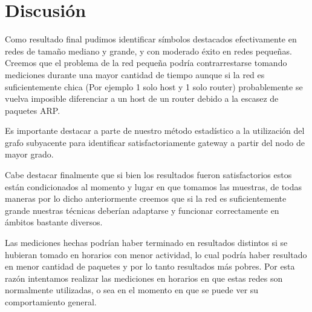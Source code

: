 \section{Discusión}

Como resultado final pudimos identificar símbolos destacados efectivamente en redes de tamaño mediano y grande, y con moderado éxito en redes pequeñas. Creemos que el problema de la red pequeña podría contrarrestarse tomando mediciones durante una mayor cantidad de tiempo aunque si la red es suficientemente chica (Por ejemplo 1 solo host y 1 solo router) probablemente se vuelva imposible diferenciar a un host de un router debido a la escasez de paquetes ARP.

Es importante destacar a parte de nuestro método estadístico a la utilización del grafo subyacente para identificar satisfactoriamente gateway a partir del nodo de mayor grado.

Cabe destacar finalmente que si bien los resultados fueron satisfactorios estos están condicionados al momento y lugar en que tomamos las muestras, de todas maneras por lo dicho anteriormente creemos que si la red es suficientemente grande nuestras técnicas deberían adaptarse y funcionar correctamente en ámbitos bastante diversos.

Las mediciones hechas podrían haber terminado en resultados distintos si se hubieran tomado en horarios con menor actividad, lo cual podría haber resultado en menor cantidad de paquetes y por lo tanto resultados más pobres. Por esta razón intentamos realizar las mediciones en horarios en que estas redes son normalmente utilizadas, o sea en el momento en que se puede ver su comportamiento general.

